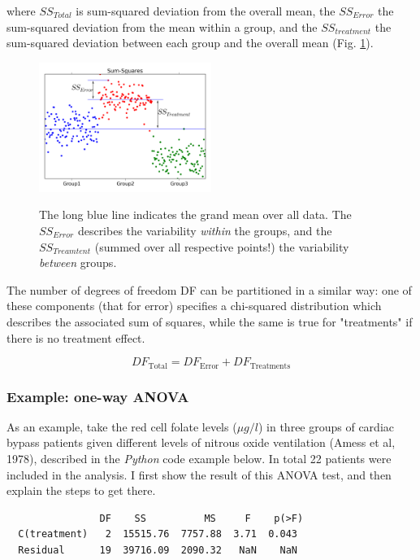 where $SS_{Total}$ is sum-squared deviation from the overall mean, the $SS_{Error}$ the sum-squared deviation from the mean within a group, and the $SS_{treatment}$ the sum-squared deviation between each group and the overall mean (Fig. \ref{fig:ANOVA_annotated}).
\begin{figure}
  \centering
  \includegraphics[width=0.5\textwidth]{../Images/anova_annotated.png}\\
  \caption{The long blue line indicates the grand mean over all data. The $SS_{Error}$ describes the variability \emph{within} the groups, and the $SS_{Treamtent}$ (summed over all respective points!) the variability \emph{between} groups.}\label{fig:ANOVA_annotated}
\end{figure}

The number of degrees of freedom DF can be partitioned in a similar way: one of these components (that for error) specifies a chi-squared distribution which describes the associated sum of squares, while the same is true for "treatments" if there is no treatment effect.

\begin{equation}
  DF_\text{Total} = DF_\text{Error} + DF_\text{Treatments}
\end{equation}


\subsubsection{Example: one-way ANOVA}
As an example, take the red cell folate levels ($\mu g/l$) in three groups of cardiac bypass patients given different levels of nitrous oxide ventilation (Amess et al, 1978), described in the \emph{Python} code example below. In total 22 patients were included in the analysis. I first show the result of this ANOVA test, and then explain the steps to get there.

\begin{verbatim}
                DF    SS          MS     F    p(>F)
  C(treatment)   2  15515.76  7757.88  3.71  0.043
  Residual      19  39716.09  2090.32   NaN    NaN
\end{verbatim}

